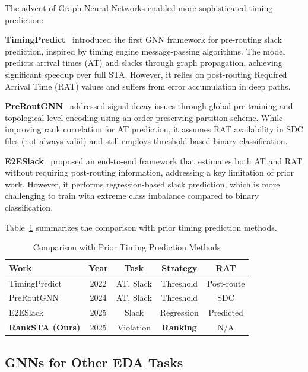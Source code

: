 \documentclass[10pt,twocolumn,journal]{IEEEtran}
\begin{document}
The advent of Graph Neural Networks enabled more sophisticated timing prediction:

\textbf{TimingPredict}~\cite{guo2022timingpredict} introduced the first GNN framework for pre-routing slack prediction, inspired by timing engine message-passing algorithms. The model predicts arrival times (AT) and slacks through graph propagation, achieving significant speedup over full STA. However, it relies on post-routing Required Arrival Time (RAT) values and suffers from error accumulation in deep paths.

\textbf{PreRoutGNN}~\cite{zhong2024preroutgnn} addressed signal decay issues through global pre-training and topological level encoding using an order-preserving partition scheme. While improving rank correlation for AT prediction, it assumes RAT availability in SDC files (not always valid) and still employs threshold-based binary classification.

\textbf{E2ESlack}~\cite{bodhe2024e2eslack} proposed an end-to-end framework that estimates both AT and RAT without requiring post-routing information, addressing a key limitation of prior work. However, it performs regression-based slack prediction, which is more challenging to train with extreme class imbalance compared to binary classification.

Table~\ref{tab:relwork} summarizes the comparison with prior timing prediction methods.

\begin{table}[t]
\centering
\caption{Comparison with Prior Timing Prediction Methods}
\label{tab:relwork}
\begin{tabular}{@{}lcccc@{}}
\toprule
\textbf{Work} & \textbf{Year} & \textbf{Task} & \textbf{Strategy} & \textbf{RAT} \\
\midrule
TimingPredict~\cite{guo2022timingpredict} & 2022 & AT, Slack & Threshold & Post-route \\
PreRoutGNN~\cite{zhong2024preroutgnn} & 2024 & AT, Slack & Threshold & SDC \\
E2ESlack~\cite{bodhe2024e2eslack} & 2025 & Slack & Regression & Predicted \\
\textbf{RankSTA (Ours)} & 2025 & Violation & \textbf{Ranking} & N/A \\
\bottomrule
\end{tabular}
\end{table}

\subsection{GNNs for Other EDA Tasks}
\end{document}
